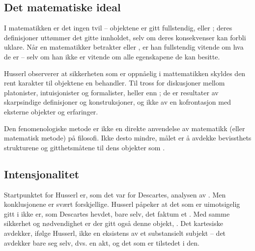 \subsection{Det matematiske ideal}
I matematikken er det ingen tvil  -- objektene 
er gitt fullstendig, eller ; deres definisjoner 
utt{\o}mmer det gitte innholdet, selv om deres konsekvenser kan 
forbli uklare. N{\aa}r en matematikker betrakter  
eller , er han fullstendig vitende om hva de er -- 
selv om han ikke er vitende  om alle egenskapene de kan besitte.

Husserl observerer at sikkerheten som er oppn{\aa}elig i 
mattematikken skyldes den rent  karakter til 
objektene en behandler. Til tross for diskusjoner mellom platonister, 
intuisjonister og formalister,  
 heller enn ; de er resultater av 
skarpsindige definisjoner og konstruksjoner, og ikke av en 
kofrontasjon med eksterne objekter og erfaringer.

Den fenomenologiske metode er ikke en direkte anvendelse av 
matematikk (eller matematisk metode) p{\aa} filosofi. Ikke desto 
mindre, m{\aa}let er {\aa} avdekke bevissthets strukturene og 
gitthetsm{\aa}tene til dens objekter som .

 
\subsection{Intensjonalitet}
Startpunktet for Husserl er, som det var for Descartes, analysen av 
. Men konklusjonene er sv{\ae}rt forskjellige. Husserl 
p{\aa}peker at det som er uimotsigelig gitt i  ikke er, 
som Descartes hevdet, bare  selv, det faktum et . Med samme sikkerhet og n{\o}dvendighet er der gitt ogs{\aa} 
denne  objekt, . Det kartesiske 
 avdekker, if{\o}lge Husserl, ikke en eksistens av et 
substansielt subjekt -- det avdekker bare seg selv, dvs. en akt, og 
det som er tilstedet i den.

